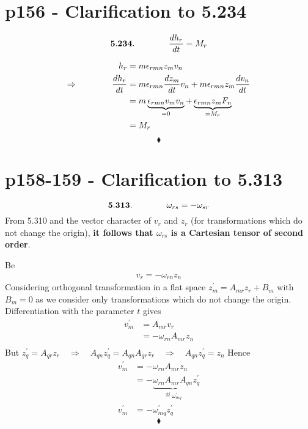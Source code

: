 \section{p156 - Clarification to 5.234}
\begin{tcolorbox}
$$\mathbf{5.234.}\quad\quad\quad\quad \dv{h_r}{t}= M_r$$
\end{tcolorbox}
\begin{align}
h_r &= m\epsilon_{rmn}z_mv_n\\
\Rightarrow \quad\quad\quad\quad \dv{h_r}{t} &= m\epsilon_{rmn}\dv{z_m}{t} v_n+m\epsilon_{rmn}z_m\dv{v_n}{t}\\
&= m\underbrace{\epsilon_{rmn}v_m v_n}_{=0}+\underbrace{\epsilon_{rmn}z_mF_n}_{=M_r}\\
&=M_r
\end{align}
$$\blacklozenge$$
\newpage



\section{p158-159 - Clarification to 5.313}
\begin{tcolorbox}
$$\mathbf{5.313.}\quad\quad\quad\quad \omega_{rs}= -\omega_{sr}$$ From 5.310 and the vector character of $v_r$ and $z_r$ (for transformations which do not change the origin), \textbf{it follows that $\omega_{rs} $ is a Cartesian tensor of second order}.
\end{tcolorbox}
Be 
\begin{align}
v^{}_r = -\omega^{}_{rn}z^{}_n
\end{align}
Considering orthogonal transformation in a flat space $z^{'}_m = A_{mr}z^{}_r+B_m$ with  $B_m=0$ as we consider only transformations which do not change the origin. Differentiation with the parameter $t$ gives 
\begin{align}
v^{'}_m &= A_{mr}v^{}_r\\
&= -\omega^{}_{rn}A_{mr}z^{}_n\\
\end{align}
But $z^{'}_q = A_{qr}z^{}_r\quad\Rightarrow \quad A_{qn}z^{'}_q = A_{qn}A_{qr}z^{}_r\quad\Rightarrow \quad A_{qn}z^{'}_q = z^{}_n$ 
Hence
\begin{align}
v^{'}_m &= -\omega^{}_{rn}A_{mr}z^{}_n\\
&= -\underbrace{\omega^{}_{rn}A_{mr}A_{qn}}_{\overset{\underset{\mathrm{def}}{}}{=}\omega_{mq}^{'}}z^{'}_q\\
v^{'}_m &= -\omega_{mq}^{'}z^{'}_q
\end{align}
$$\blacklozenge$$
\newpage


